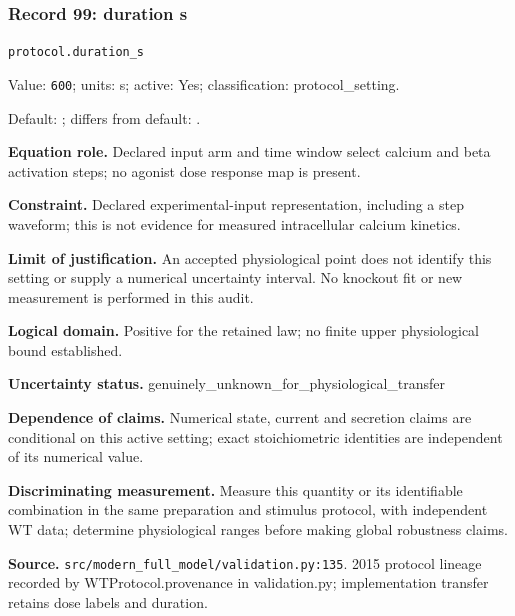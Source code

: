 \subsubsection*{Record 99: duration s}
{\small \nolinkurl{protocol.duration_s}\par

Value: \texttt{600}; units: s; active: Yes; classification: protocol\_setting.\par

Default: ; differs from default: .\par

\textbf{Equation role.} Declared input arm and time window select calcium and beta activation steps; no agonist dose response map is present.\par

\textbf{Constraint.} Declared experimental-input representation, including a step waveform; this is not evidence for measured intracellular calcium kinetics.\par

\textbf{Limit of justification.} An accepted physiological point does not identify this setting or supply a numerical uncertainty interval. No knockout fit or new measurement is performed in this audit.\par

\textbf{Logical domain.} Positive for the retained law; no finite upper physiological bound established.\par

\textbf{Uncertainty status.} genuinely\_unknown\_for\_physiological\_transfer\par

\textbf{Dependence of claims.} Numerical state, current and secretion claims are conditional on this active setting; exact stoichiometric identities are independent of its numerical value.\par

\textbf{Discriminating measurement.} Measure this quantity or its identifiable combination in the same preparation and stimulus protocol, with independent WT data; determine physiological ranges before making global robustness claims.\par

\textbf{Source.} \nolinkurl{src/modern_full_model/validation.py:135}. 2015 protocol lineage recorded by WTProtocol.provenance in validation.py; implementation transfer retains dose labels and duration.\par}

